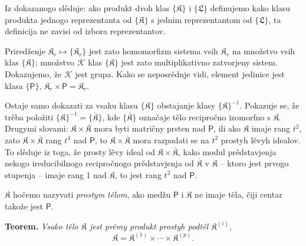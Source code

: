 \documentclass[11pt]{article}
\begin{document}
Iz dokazanogo slěduje: ako produkt dvoh klas \(\{\mathfrak K\}\) i \(\{\mathfrak L\}\) definujemo kako klasu produkta jednogo reprezentanta od \(\{\mathfrak K\}\) s jednim reprezentantom od \(\{\mathfrak L\}\), ta definicija ne zavisi od izbora reprezentantov.

Priredženje \(\mathfrak K_r\mapsto\{\mathfrak K_r\}\) jest zato homomorfizm sistema vsih \(\mathfrak K_r\) na množstvo vsih klas \(\{\mathfrak K\}\); množstvo \(\mathscr K\) klas \(\{\mathfrak K\}\) jest zato multiplikativno zatvorjeny sistem. Dokazujemo, že \(\mathscr K\) jest grupa. Kako se neposrědnje vidi, element jedinice jest klasa \(\{\mathsf P\}\), \(\mathfrak K_r\times\mathsf P=\mathfrak K_r\).

Ostaje samo dokazati za vsaku klasu \(\{\mathfrak K\}\) obstajanje klasy \(\{\mathfrak K\}^{-1}\). Pokazuje se, že trěba položiti \(\{\mathfrak K\}^{-1}=\{\overline{\mathfrak K}\}\), kde \(\{\overline{\mathfrak K}\}\) označaje tělo recipročno izomorfno s \(\mathfrak K\). Drugymi slovami: \(\mathfrak K\times\overline{\mathfrak K}\) mora byti matričny prsten nad \(\mathsf P\), ili ako \(\mathfrak K\) imaje rang \(t^2\), zato \(\mathfrak K\times\overline{\mathfrak K}\) rang \(t^4\) nad \(\mathsf P\), to \(\mathfrak K\times\overline{\mathfrak K}\) mora razpadati se na \(t^2\) prostyh lěvyh idealov. To slěduje iz toga, že prosty lěvy ideal od \(\mathfrak K\times\overline{\mathfrak K}\), kako modul prědstavjenja nekogo ireducibilnogo recipročnogo prědstavjenja od \(\overline{\mathfrak K}\) v \(\mathfrak K\) -- ktoro jest prvogo stupenja -- imaje rang 1 nad \(\mathfrak K\), to jest rang \(t^2\) nad \(\mathsf P\).

\(\mathfrak K\) hočemo nazyvati \emph{prostym tělom}, ako medžu \(\mathsf P\) i \(\mathfrak K\) ne imaje těla, čiji centar takože jest \(\mathsf P\).

\textbf{Teorem.} \emph{Vsako tělo \(\mathfrak K\) jest prěmy produkt prostyh podtěl \(\mathfrak K^{(i)}\),}
\[
\mathfrak K=\mathfrak K^{(1)}\times\cdots\times\mathfrak K^{(p)}.
\]
\end{document}
